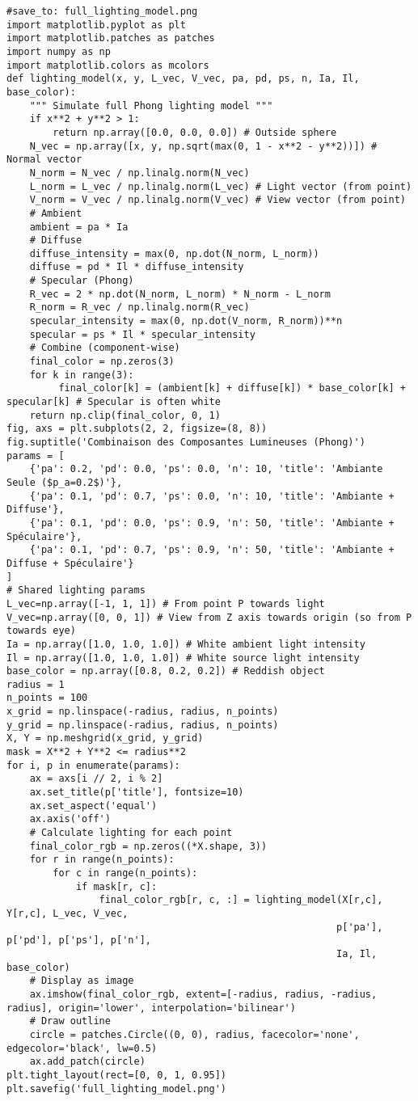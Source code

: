 \begin{verbatim}
#save_to: full_lighting_model.png
import matplotlib.pyplot as plt
import matplotlib.patches as patches
import numpy as np
import matplotlib.colors as mcolors
def lighting_model(x, y, L_vec, V_vec, pa, pd, ps, n, Ia, Il, base_color):
    """ Simulate full Phong lighting model """
    if x**2 + y**2 > 1:
        return np.array([0.0, 0.0, 0.0]) # Outside sphere
    N_vec = np.array([x, y, np.sqrt(max(0, 1 - x**2 - y**2))]) # Normal vector
    N_norm = N_vec / np.linalg.norm(N_vec)
    L_norm = L_vec / np.linalg.norm(L_vec) # Light vector (from point)
    V_norm = V_vec / np.linalg.norm(V_vec) # View vector (from point)
    # Ambient
    ambient = pa * Ia
    # Diffuse
    diffuse_intensity = max(0, np.dot(N_norm, L_norm))
    diffuse = pd * Il * diffuse_intensity
    # Specular (Phong)
    R_vec = 2 * np.dot(N_norm, L_norm) * N_norm - L_norm
    R_norm = R_vec / np.linalg.norm(R_vec)
    specular_intensity = max(0, np.dot(V_norm, R_norm))**n
    specular = ps * Il * specular_intensity
    # Combine (component-wise)
    final_color = np.zeros(3)
    for k in range(3):
         final_color[k] = (ambient[k] + diffuse[k]) * base_color[k] + specular[k] # Specular is often white
    return np.clip(final_color, 0, 1)
fig, axs = plt.subplots(2, 2, figsize=(8, 8))
fig.suptitle('Combinaison des Composantes Lumineuses (Phong)')
params = [
    {'pa': 0.2, 'pd': 0.0, 'ps': 0.0, 'n': 10, 'title': 'Ambiante Seule ($p_a=0.2$)'},
    {'pa': 0.1, 'pd': 0.7, 'ps': 0.0, 'n': 10, 'title': 'Ambiante + Diffuse'},
    {'pa': 0.1, 'pd': 0.0, 'ps': 0.9, 'n': 50, 'title': 'Ambiante + Spéculaire'},
    {'pa': 0.1, 'pd': 0.7, 'ps': 0.9, 'n': 50, 'title': 'Ambiante + Diffuse + Spéculaire'}
]
# Shared lighting params
L_vec=np.array([-1, 1, 1]) # From point P towards light
V_vec=np.array([0, 0, 1]) # View from Z axis towards origin (so from P towards eye)
Ia = np.array([1.0, 1.0, 1.0]) # White ambient light intensity
Il = np.array([1.0, 1.0, 1.0]) # White source light intensity
base_color = np.array([0.8, 0.2, 0.2]) # Reddish object
radius = 1
n_points = 100
x_grid = np.linspace(-radius, radius, n_points)
y_grid = np.linspace(-radius, radius, n_points)
X, Y = np.meshgrid(x_grid, y_grid)
mask = X**2 + Y**2 <= radius**2
for i, p in enumerate(params):
    ax = axs[i // 2, i % 2]
    ax.set_title(p['title'], fontsize=10)
    ax.set_aspect('equal')
    ax.axis('off')
    # Calculate lighting for each point
    final_color_rgb = np.zeros((*X.shape, 3))
    for r in range(n_points):
        for c in range(n_points):
            if mask[r, c]:
                final_color_rgb[r, c, :] = lighting_model(X[r,c], Y[r,c], L_vec, V_vec,
                                                         p['pa'], p['pd'], p['ps'], p['n'],
                                                         Ia, Il, base_color)
    # Display as image
    ax.imshow(final_color_rgb, extent=[-radius, radius, -radius, radius], origin='lower', interpolation='bilinear')
    # Draw outline
    circle = patches.Circle((0, 0), radius, facecolor='none', edgecolor='black', lw=0.5)
    ax.add_patch(circle)
plt.tight_layout(rect=[0, 0, 1, 0.95])
plt.savefig('full_lighting_model.png')
\end{verbatim}
